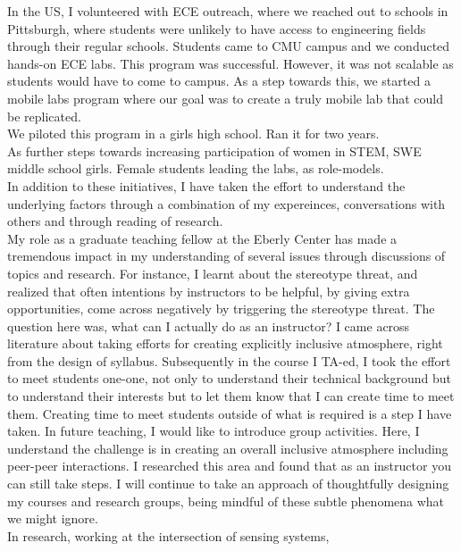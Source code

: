 \documentclass[10pt]{article}
\begin{document}
In the US, I volunteered with ECE outreach, where we reached out to schools in Pittsburgh, where students were unlikely to have access to engineering fields through their regular schools. Students came to CMU campus and we conducted hands-on ECE labs. This program was successful. However, it was not scalable as students would have to come to campus. As a step towards this, we started a mobile labs program where our goal was to create a truly mobile lab that could be replicated. \\

We piloted this program in a girls high school. Ran it for two years. \\
As further steps towards increasing participation of women in STEM, SWE middle school girls. Female students leading the labs, as role-models.\\

In addition to these initiatives, I have taken the effort to understand the underlying factors through a combination of my expereinces, conversations with others and through reading of research. \\
My role as a graduate teaching fellow at the Eberly Center has made a tremendous impact in my understanding of several issues through discussions of topics and research. For instance, I learnt about the stereotype threat, and realized that often intentions by instructors to be helpful, by giving extra opportunities, come across negatively by triggering the stereotype threat. The question here was, what can I actually do as an instructor? I came across literature about taking efforts for creating explicitly inclusive atmosphere, right from the design of syllabus. Subsequently in the course I TA-ed, I took the effort to meet students one-one, not only to understand their technical background but to understand their interests but to let them know that I can create time to meet them. Creating time to meet students outside of what is required is a step I have taken. In future teaching, I would like to introduce group activities. Here, I understand the challenge is in creating an overall inclusive atmosphere including peer-peer interactions. I researched this area and found that as an instructor you can still take steps. I will continue to take an approach of thoughtfully designing my courses and research groups, being mindful of these subtle phenomena what we might ignore. \\   

In research, working at the intersection of sensing systems, 
\end{document}

